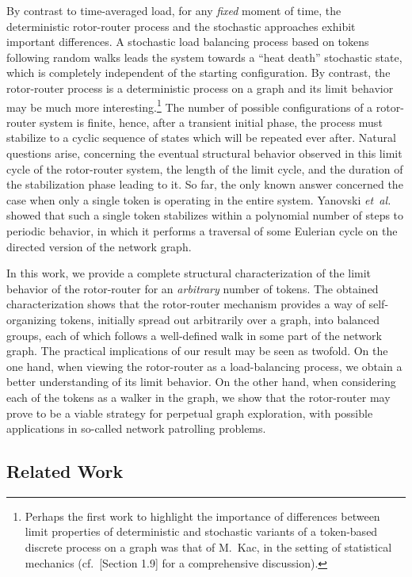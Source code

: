 \documentclass{article}[11pt,letter]
\newcommand{\etal}{{\it et~al.}}
\begin{document}
By contrast to time-averaged load, for any \emph{fixed} moment of time, the deterministic rotor-router process and the stochastic approaches exhibit important differences. A stochastic load balancing process based on tokens following random walks leads the system towards a ``heat death'' stochastic state, which is completely independent of the starting configuration. By contrast, the rotor-router process is a deterministic process on a graph and its limit behavior may be much more interesting.\footnote{Perhaps the first work to highlight the importance of differences between limit properties of deterministic and stochastic variants of a token-based discrete process on a graph was that of M.~Kac, in the setting of statistical mechanics (cf.~\cite{thompson2015mathematical}[Section 1.9] for a comprehensive discussion).} The number of possible configurations of a rotor-router system is finite, hence, after a transient initial phase, the process must stabilize to a cyclic sequence of states which will be repeated ever after. Natural questions arise, concerning the eventual structural behavior observed in this limit cycle of the rotor-router system, the length of the limit cycle, and the duration of the stabilization phase leading to it. So far, the only known answer concerned the case when only a single token is operating in the entire system. Yanovski \etal~\cite{YanovskiWB03} showed that such a single token stabilizes within a polynomial number of steps to periodic behavior, in which it performs a traversal of some Eulerian cycle on the directed version of the network graph.

In this work, we provide a complete structural characterization of the limit behavior of the rotor-router for an \emph{arbitrary} number  of tokens. The obtained characterization shows that the rotor-router mechanism provides a way of self-organizing tokens, initially spread out arbitrarily over a graph, into balanced groups, each of which follows a well-defined walk in some part of the network graph. The practical implications of our result may be seen as twofold. On the one hand, when viewing the rotor-router as a load-balancing process, we obtain a better understanding of its limit behavior. On the other hand, when considering each of the tokens as a walker in the graph, we show that the rotor-router may prove to be a viable strategy for perpetual graph exploration, with possible applications in so-called network patrolling problems.

\subsection{Related Work}
\end{document}

